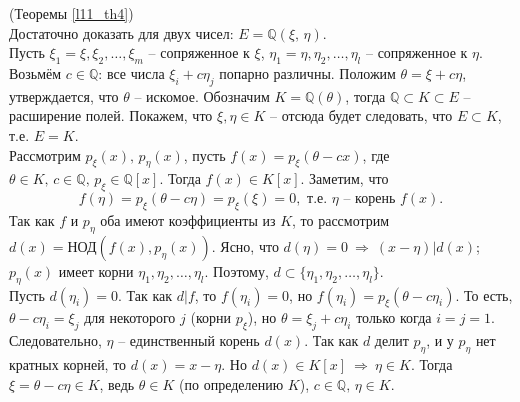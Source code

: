 \begin{pf} (Теоремы \ref{l11_th4})\\
	Достаточно доказать для двух чисел: $E=\mathbb{Q}(\xi,\,\eta)$.\\
	Пусть $\xi_1 = \xi, \xi_2,\dots,\xi_m$ -- сопряженное к $\xi$, $\eta_1 = \eta, \eta_2,\dots,\eta_l$ -- сопряженное к $\eta$.	Возьмём $c \in \mathbb{Q}$: все числа $\xi_i + c\eta_j$ попарно различны. Положим $\theta = \xi + c\eta$, утверждается, что $\theta$ -- искомое. Обозначим $K = \mathbb{Q}(\theta)$, тогда $\mathbb{Q} \subset K \subset E$ -- расширение полей. Покажем, что $\xi, \eta \in K$ -- отсюда будет следовать, что $E \subset K$, т.е. $E=K$.\\
	Рассмотрим $p_\xi(x),\,p_\eta(x)$, пусть $f(x) = p_\xi(\theta - cx)$, где $\theta \in K, \, c \in \mathbb{Q}, \, p_\xi \in \mathbb{Q}[x]$. Тогда $f(x) \in K[x]$. Заметим, что
	$$f(\eta) = p_\xi(\theta - c\eta) = p_\xi(\xi) =0, \text{ т.е. } \eta \text{ -- корень } f(x).$$
	Так как $f$ и $p_\eta$ оба имеют коэффициенты из $K$, то рассмотрим $d(x) = \text{НОД}(f(x), p_\eta(x))$. Ясно, что $d(\eta) = 0 \ \Rightarrow \ (x-\eta) \vert d(x)$; $p_\eta(x)$ имеет корни $\eta_1, \eta_2, \dots, \eta_l$. Поэтому, $d \subset \{ \eta_1, \eta_2, \dots, \eta_l \}$.\\
	Пусть $d(\eta_i)=0$. Так как $d \vert f$, то $f(\eta_i)=0$, но $f(\eta_i) = p_\xi(\theta - c\eta_i)$. То есть, $\theta - c\eta_i = \xi_j$ для некоторого $j$ (корни $p_\xi$), но $\theta = \xi_j + c\eta_i$ только когда $i=j=1$. Следовательно, $\eta$ -- единственный корень $d(x)$. Так как $d$ делит $p_\eta$, и у $p_\eta$ нет кратных корней, то $d(x) = x - \eta$. Но $d(x) \in K[x] \ \Rightarrow \ \eta \in K$. Тогда $\xi = \theta - c\eta \in K$, ведь $\theta \in K$ (по определению $K$), $c \in \mathbb{Q}, \, \eta \in K$.
\end{pf}

